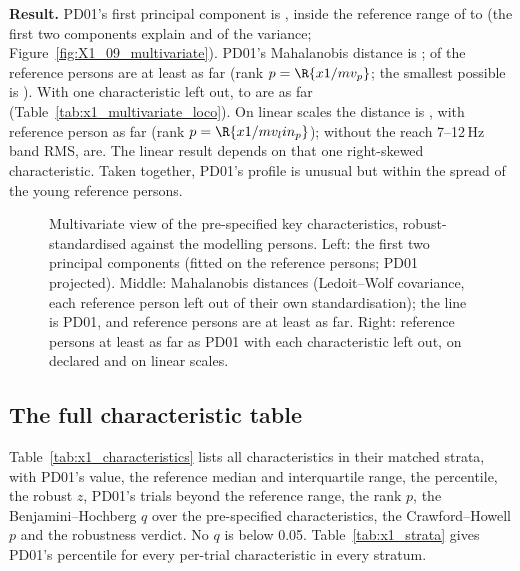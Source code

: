 \textbf{Result.}
PD01's first principal component is , inside the reference range of  to  (the first two components explain  and  of the variance; Figure~\ref{fig:X1_09_multivariate}).
PD01's Mahalanobis distance is ;  of the  reference persons are at least as far (rank $p = \R{x1/mv_p}$; the smallest possible is ).
With one characteristic left out,  to  are as far (Table~\ref{tab:x1_multivariate_loco}).
On linear scales the distance is , with  reference person as far (rank $p = \R{x1/mv_lin_p}$); without the reach 7--12\,Hz band RMS,  are.
The linear result depends on that one right-skewed characteristic.
Taken together, PD01's profile is unusual but within the spread of the young reference persons.

\begin{figure}[htbp]
  \centering
  \caption{Multivariate view of the  pre-specified key characteristics, robust-standardised against the  modelling persons.
    Left: the first two principal components (fitted on the reference persons; PD01 projected).
    Middle: Mahalanobis distances (Ledoit--Wolf covariance, each reference person left out of their own standardisation); the line is PD01, and  reference persons are at least as far.
    Right: reference persons at least as far as PD01 with each characteristic left out, on declared and on linear scales.}
  \label{fig:X1_09_multivariate}\label{fig:app:pd01-multivariate}
\end{figure}


\FloatBarrier
\subsection{The full characteristic table}\label{app:pd01:table}

Table~\ref{tab:x1_characteristics} lists all  characteristics in their matched strata, with PD01's value, the reference median and interquartile range, the percentile, the robust $z$, PD01's trials beyond the reference range, the rank $p$, the Benjamini--Hochberg $q$ over the  pre-specified characteristics, the Crawford--Howell $p$ and the robustness verdict.
No $q$ is below 0.05.
Table~\ref{tab:x1_strata} gives PD01's percentile for every per-trial characteristic in every stratum.

